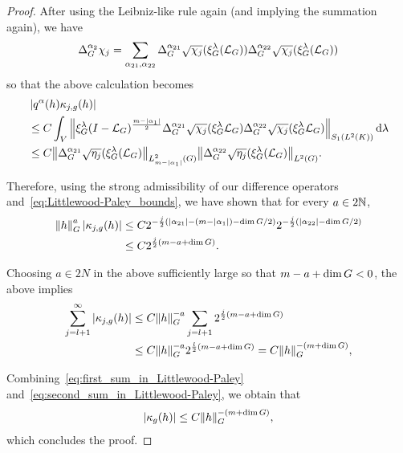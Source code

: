 \begin{proof}
    After using the Leibniz-like rule again (and implying the summation again),
    we have
    \begin{align*}
        \DifferenceOperatorOrder {\alpha_2} \chi_j
        = \sum_{\alpha_{21}, \alpha_{22}}
        \DifferenceOperatorOrder {\alpha_{21}} \sqrt {\chi_j}(\Rep \lambda(\Laplacian))
        \DifferenceOperatorOrder {\alpha_{22}} \sqrt {\chi_j}(\Rep \lambda(\Laplacian))
    \end{align*}
    so that the above calculation becomes
    \begin{align*}
        &\abs {q^\alpha(h) \kappa_{j, g}(h)}\\
        &\leq C
        \int_\VectorSpace
        \norm [\SchattenClasses 1 {\Lebesgue 2 \CompactGroup}] {
            \Rep \lambda \BesselPotential {m - \abs {\alpha_1}}
            \DifferenceOperatorOrder {\alpha_{21}} \sqrt {\chi_j}(\Rep \lambda \Laplacian)
            \DifferenceOperatorOrder {\alpha_{22}} \sqrt {\chi_j}(\Rep \lambda \Laplacian)
        } \dd \lambda\\
        &\leq C
        \norm [\Sobolev {m - \abs {\alpha_1}}] {\DifferenceOperatorOrder {\alpha_{21}} \sqrt {\eta_j}(\Rep\lambda (\Laplacian)}
        \norm [\Lebesgue 2 \Group] {\DifferenceOperatorOrder {\alpha_{22}} \sqrt {\eta_j}(\Rep\lambda (\Laplacian)}.
    \end{align*}

    Therefore,
    using the strong admissibility of our difference operators
    and~\eqref{eq:Littlewood-Paley_bounds},
    we have shown that for every $a \in 2 \N$,
    \begin{align*}
        \norm [\Group] h^{a} \abs {\kappa_{j, g}(h)}
        &\leq
        C
        2^{-\frac j 2 (\abs {\alpha_{21}} - (m - \abs{\alpha_1}) - \dim \Group/2)}
        2^{-\frac j 2 (\abs {\alpha_{22}} - \dim \Group/2)}\\
        &\leq C 2^{\frac j 2(m - a + \dim \Group)}.
    \end{align*}

    Choosing $a \in 2N$ in the above sufficiently large so that $m - a + \dim \Group < 0$,
    the above implies
    \begin{align}
        \sum_{j = l + 1}^\infty \abs {\kappa_{j, g}(h)}
        &\leq
        C \norm [\Group] h^{-a} \sum_{j = l + 1} 2^{\frac j 2(m - a + \dim \Group)}\\
        &\leq
        C \norm [\Group] h^{-a} 2^{\frac l 2(m - a + \dim \Group)}
        = C \norm [\Group] h^{-(m + \dim \Group)},
        \label{eq:second_sum_in_Littlewood-Paley}
    \end{align}

    Combining~\eqref{eq:first_sum_in_Littlewood-Paley} and~\eqref{eq:second_sum_in_Littlewood-Paley},
    we obtain that
    \begin{align*}
        \abs {\kappa_g(h)} \leq C \norm [\Group] h^{-(m + \dim \Group)},
    \end{align*}
    which concludes the proof.
\end{proof}

